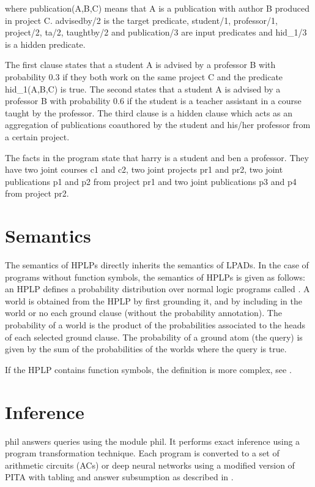 \documentclass[letterpaper,10pt,english]{sphinxmanual}
\begin{document}
where publication(A,B,C) means that A is a publication with author B produced in project C. advisedby/2 is the target predicate, student/1, professor/1, project/2, ta/2, taughtby/2 and publication/3 are input predicates and hid\_1/3 is a hidden predicate.

The first clause states that a student A is advised by a professor B with probability 0.3 if they both work on the same project C and the predicate hid\_1(A,B,C) is true.
The second states that a student A is advised by a professor B with probability 0.6 if the student is a teacher assistant in a course taught by the professor.
The third clause is a hidden clause which acts as an aggregation of publications coauthored by the student and his/her professor from a certain project.

The facts in the program state that harry is a student and ben a professor. They have two joint courses c1 and c2, two joint projects pr1 and pr2, two joint publications p1 and p2 from project pr1 and two joint publications p3 and p4 from project pr2.


\chapter{Semantics}
\label{\detokenize{index:semantics}}
The semantics of HPLPs directly inherits the semantics of LPADs. In the case of programs without function symbols, the semantics of HPLPs is given as follows: an HPLP defines a probability distribution over normal logic programs called .
A world is obtained from the HPLP by first grounding it, and by including in the world or no each ground clause (without the probability annotation).
The probability of a world is the product of the probabilities associated to the heads of each selected ground clause.
The probability of a ground atom (the query) is given by the sum of the probabilities of the worlds where the query is true.

If the HPLP contains function symbols, the definition is more complex, see \label{\detokenize{index:id6}}{\hyperref[\detokenize{index:dblp-journals-ai-poole97}]{\sphinxcrossref{{[}Poo97{]}}}}\label{\detokenize{index:id7}}{\hyperref[\detokenize{index:dblp-journals-jair-satok01}]{\sphinxcrossref{{[}SK01{]}}}}.


\chapter{Inference}
\label{\detokenize{index:inference}}
phil answers queries using the module phil. It performs exact inference using a program transformation technique.  Each program is converted to a set of arithmetic circuits (ACs) or deep neural networks using a modified version of PITA \label{\detokenize{index:id8}}{\hyperref[\detokenize{index:rig14-cj-ij}]{\sphinxcrossref{{[}Rig14{]}}}} with tabling and answer subsumption \label{\detokenize{index:id9}}{\hyperref[\detokenize{index:rigswi10-iclp10-ic}]{\sphinxcrossref{{[}RS10{]}}}} as described in \label{\detokenize{index:id10}}{\hyperref[\detokenize{index:ngulamrig17-plp-iw}]{\sphinxcrossref{{[}NguembangFadjaLR17{]}}}}.
\end{document}

